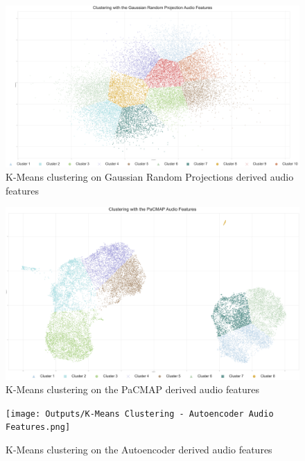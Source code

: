 \begin{appendix}
\begin{figure}[!htb]
    \includegraphics[scale=0.08]{Outputs/K-Means Clustering - Gaussian Random Projections Audio Features.png}
    \caption{K-Means clustering on Gaussian Random Projections derived audio features}
    \label{fig:kmeans-fourth}
\end{figure}
\begin{figure}[!htb]
    \centering
    \includegraphics[scale=0.08]{Outputs/K-Means Clustering - PaCMAP Features.png}
    \caption{K-Means clustering on the PaCMAP derived audio features}
    \label{fig:kmeans-fifth}
\end{figure}
\begin{figure}[!htb]
    \centering
    \texttt{[image: Outputs/K-Means Clustering - Autoencoder Audio Features.png]}
    \caption{K-Means clustering on the Autoencoder derived audio features}
    \label{fig:kmeans-sixth}
\end{figure}
\FloatBarrier

\end{appendix}
